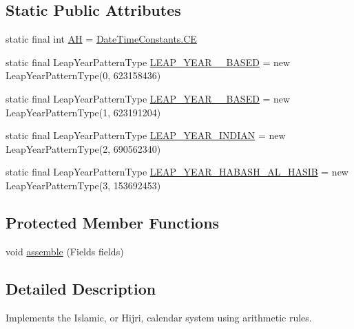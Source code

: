 \subsection*{Static Public Attributes}
\begin{DoxyCompactItemize}
\item 
static final int \hyperlink{classorg_1_1joda_1_1time_1_1chrono_1_1_islamic_chronology_acda6d08a0c9eae8a4c964f6a02d19aea}{A\-H} = \hyperlink{classorg_1_1joda_1_1time_1_1_date_time_constants_aacd9ad6e2964b143878d155f86db83bd}{Date\-Time\-Constants.\-C\-E}
\item 
static final Leap\-Year\-Pattern\-Type \hyperlink{classorg_1_1joda_1_1time_1_1chrono_1_1_islamic_chronology_a47c66f1702f8a935af8c52bb4891edc2}{L\-E\-A\-P\-\_\-\-Y\-E\-A\-R\-\_\-\_\-\-B\-A\-S\-E\-D} = new Leap\-Year\-Pattern\-Type(0, 623158436)
\item 
static final Leap\-Year\-Pattern\-Type \hyperlink{classorg_1_1joda_1_1time_1_1chrono_1_1_islamic_chronology_a6884b9ea2822e6952ee34e4119e237d8}{L\-E\-A\-P\-\_\-\-Y\-E\-A\-R\-\_\-\_\-\-B\-A\-S\-E\-D} = new Leap\-Year\-Pattern\-Type(1, 623191204)
\item 
static final Leap\-Year\-Pattern\-Type \hyperlink{classorg_1_1joda_1_1time_1_1chrono_1_1_islamic_chronology_a3df09d501cb3b9178f69b1b2f043dc39}{L\-E\-A\-P\-\_\-\-Y\-E\-A\-R\-\_\-\-I\-N\-D\-I\-A\-N} = new Leap\-Year\-Pattern\-Type(2, 690562340)
\item 
static final Leap\-Year\-Pattern\-Type \hyperlink{classorg_1_1joda_1_1time_1_1chrono_1_1_islamic_chronology_a49b42523a1767c0fc8b78eb35f1fc409}{L\-E\-A\-P\-\_\-\-Y\-E\-A\-R\-\_\-\-H\-A\-B\-A\-S\-H\-\_\-\-A\-L\-\_\-\-H\-A\-S\-I\-B} = new Leap\-Year\-Pattern\-Type(3, 153692453)
\end{DoxyCompactItemize}
\subsection*{Protected Member Functions}
\begin{DoxyCompactItemize}
\item 
void \hyperlink{classorg_1_1joda_1_1time_1_1chrono_1_1_islamic_chronology_ad63c6365f7d17c675efc3815d3a41c3e}{assemble} (Fields fields)
\end{DoxyCompactItemize}


\subsection{Detailed Description}
Implements the Islamic, or Hijri, calendar system using arithmetic rules. 

